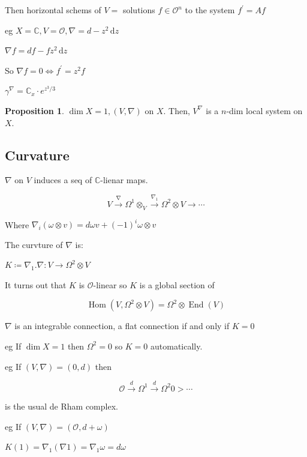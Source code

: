 \documentclass{article}
\theoremstyle{definition}
\newtheorem{proposition}[theorem]{Proposition}
\begin{document}
    Then horizontal schems of \(V =\) solutions \(f\in \mathcal{O}^n\) to the system \(f^{\prime} = Af\) 

    eg \(X = \mathbb{C} , V = \mathcal{O} , \nabla = d - z^2 \, \mathrm{d} z\)
    
    \(\nabla f = df - fz^2 \, \mathrm{d}z\) 

    So \(\nabla f = 0 \iff f^{\prime} = z^2 f\)
    
    \(\gamma^\nabla = \mathbb{C}_x \cdot e^{z^3 / 3}\) 

    \begin{proposition}
        \(\dim X = 1, (V,\nabla)\) on \(X\). Then, \(V^\nabla\) is a \(n\)-dim local system on \(X\). 
    \end{proposition}

    \subsection*{Curvature}

    \(\nabla\) on \(V\) induces a seq of \(\mathbb{C}\)-lienar maps.

    \[
        V \xrightarrow{\nabla} \Omega^1 \otimes_ V \xrightarrow{\nabla_1} \Omega^2 \otimes V \to \cdots 
    \]

    Where \(\nabla_i(\omega \otimes v) = d \omega v + (-1)^i \omega \otimes v\) 

    The curvture of \(\nabla\) is:

    \(K \coloneqq \nabla_1 . \nabla: V \to \Omega^2 \otimes V\)
    
    It turns out that \(K\) is \(\mathcal{O}\)-linear so \(K\) is a global section of

    \[
        \operatorname{Hom}(V, \Omega^2 \otimes V) = \Omega^2 \otimes \operatorname{End}(V) 
    \]

    \(\nabla\) is an integrable connection, a flat connection if and only if \(K = 0\)
    
    eg If \(\dim X = 1\) then \(\Omega ^2 = 0\) so \(K = 0\) automatically.

    eg If \((V,\nabla) = (0,d)\) then

    \[
        \mathcal{O} \xrightarrow{d} \Omega^1 \xrightarrow{d} \Omega^2 0>\cdots 
    \]

    is the usual de Rham complex.

    eg If \((V,\nabla) = (\mathcal{O}, d+\omega)\)
    
    \(K(1) = \nabla_1(\nabla 1) = \nabla_1 \omega = d \omega\) 
\end{document}
